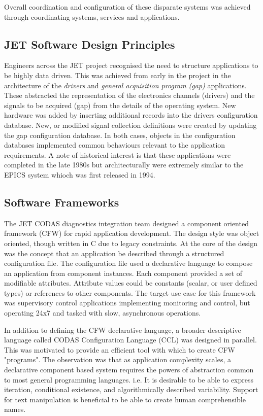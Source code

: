 \documentclass[preprint,12pt]{elsarticle}
\begin{document}


Overall coordination and configuration of these disparate systems was achieved through coordinating systems, services
and applications.

\subsection{JET Software Design Principles}

Engineers across the JET project recognised the need to structure applications to be highly data driven.
This was achieved from early in the project in the architecture of the {\em drivers} and {\em general acquisition program (gap)} applications.
These abstracted the representation of the electronics channels (drivers) and the signals to be acquired (gap) 
from the details of the operating system.  New hardware was added by inserting additional records into 
the drivers configuration database.  New, or modified signal collection definitions
were created by updating the gap configuration database.  In both cases, objects in the 
configuration databases implemented common behaviours relevant to the application requirements.
A note of historical interest is that these applications were completed in the late 1980s
but architecturally were extremely similar to the EPICS system whioch was first released in 1994.

\subsection{Software Frameworks}

The JET CODAS diagnostics integration team designed a component oriented framework (CFW)
for rapid application development. The design style was object oriented, though
written in C due to legacy constraints.  At the core of the design was the concept
that an application be described through a structured configuration file.
The configuration file used a declarative language to compose an application
from component instances. Each component provided a set of modifiable attributes.
Attribute values could be constants (scalar, or user defined types) or 
references to other components.  The target use case for this framework was supervisory
control applications implementing monitoring and control, but operating 24x7 and 
tasked with slow, asynchronous operations.

In addition to defining the CFW declarative language, a broader descriptive language
called CODAS Configuration Language (CCL) was designed in parallel.  This was motivated 
to provide an efficient tool with which to create CFW "programs".  The observation
was that as application complexity scales, a declarative component based system
requires the powers of abstraction common to most general programming languages.
i.e. It is desirable to be able to express iteration, conditional existence, 
and algorithmically described variability.  Support for text manipulation is
beneficial to be able to create human comprehensible names.
\end{document}
